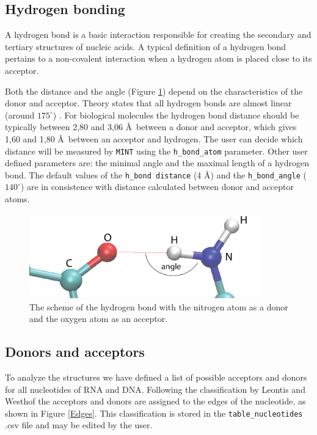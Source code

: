 \documentclass[12pt]{article}
\begin{document}
\subsection{Hydrogen bonding}
\label{Hbond-section}
A hydrogen bond is a basic interaction responsible for creating the secondary and tertiary structures of nucleic acids. A typical definition of a hydrogen bond pertains to a non-covalent interaction when a hydrogen atom is placed close to its acceptor.

Both the distance and the angle (Figure \ref{hbond}) depend on the characteristics of the donor and acceptor. Theory states that all hydrogen bonds are almost linear (around $175^\circ$) \cite{Guerra2000}. For biological molecules the hydrogen bond distance should be typically between 2,80 and 3,06 \AA\ between a donor and acceptor, which gives 1,60 and 1,80 \AA\ between an acceptor and hydrogen. The user can decide which distance will be measured by {\tt MINT} using the \texttt{h\_bond\_atom} parameter.
Other user defined parameters are: the minimal angle and the maximal length of a hydrogen bond. The default values of the \texttt{h\_bond distance} (4 \AA) and the \texttt{h\_bond\_angle} ($140^\circ$) are in consistence with distance calculated between donor and acceptor atoms. 


\begin{figure}[h!]
\centering
\includegraphics[width = 10cm]{./pictures/hydrogen_bond_2.png}
\caption{The scheme of the hydrogen bond with the nitrogen atom as a donor and the oxygen atom as an acceptor.}
\label{hbond}
\end{figure}

\subsection{Donors and acceptors}
\label{donrsandacceptors}
To analyze the structures we have defined a list of possible acceptors and donors for all nucleotides of RNA and DNA. Following the classification by Leontis and Westhof \cite{Leontis2002} the acceptors and donors are assigned to the edges of the nucleotide, as shown in Figure \ref{Edges}. This classification is stored in the {\tt table\_nucleotides} .csv file and may be edited by the user. 
\end{document}

